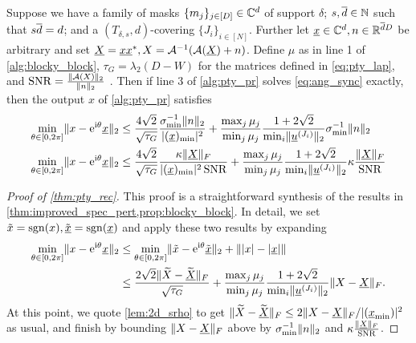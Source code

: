 \begin{theorem} \label{thm:pty_rec}
  Suppose we have a family of masks $\{m_j\}_{j \in [D]} \in \mathbb{C}^d$ of support $\delta$; $s, \overline{d} \in \mathbb{N}$ such that $s \overline{d} = d$; and a $(T_{\delta, s}, d)$-covering $\{J_i\}_{i \in [N]}$.  Further let $\underline{x} \in \mathbb{C}^d, n \in \mathbb{R}^{\overline{d} D}$ be arbitrary and set $\underline{X} = \underline{x} \underline{x}^*, X = \mathcal{A}^{-1}(\mathcal{A}(\underline{X}) + n)$.  Define $\mu$ as in line 1 of \cref{alg:blocky_block}, $\tau_G = \lambda_2(D - W)$ for the matrices defined in \eqref{eq:pty_lap}, and $\operatorname{SNR} = \frac{\lVert\mathcal{A}(X)\rVert_2}{\lVert n\rVert_2}$%
  .  Then if line 3 of \cref{alg:pty_pr} solves \eqref{eq:ang_sync} exactly, then the output $x$ of \cref{alg:pty_pr} satisfies \begin{equation}\begin{aligned} \min_{\theta \in [0, 2\pi]} \lVert x - \mathrm{e}^{\mathrm{i} \theta} \underline{x}\rVert_2 &\le \dfrac{4 \sqrt{2}}{\sqrt{\tau_G}} \dfrac{\sigma_{\min}^{-1} \lVert n\rVert_2}{\lvert(\underline{x})_{\min}\rvert^2} + \dfrac{\max_j \mu_j}{\min_j \mu_j} \dfrac{1 + 2 \sqrt{2}}{\min_i \lVert\underline{u}^{(J_i)}\rVert_2} \sigma_{\min}^{-1} \lVert n\rVert_2 \\ \min_{\theta \in [0, 2\pi]} \lVert x - \mathrm{e}^{\mathrm{i} \theta} \underline{x}\rVert_2 &\le \dfrac{4 \sqrt{2}}{\sqrt{\tau_G}} \dfrac{\kappa \lVert\underline{X}\rVert_F}{\lvert(\underline{x})_{\min}\rvert^2 \operatorname{SNR}} + \dfrac{\max_j \mu_j}{\min_j \mu_j} \dfrac{1 + 2 \sqrt{2}}{\min_i \lVert\underline{u}^{(J_i)}\rVert_2} \kappa \frac{\lVert\underline{X}\rVert_F}{\operatorname{SNR}} \end{aligned} \label{eq:pty_rec}\end{equation}
\end{theorem}

\begin{proof}[Proof of \cref{thm:pty_rec}]
  This proof is a straightforward synthesis of the results in \cref{thm:improved_spec_pert,prop:blocky_block}.  In detail, we set $\tilde{x} = \operatorname{sgn}(x), \tilde{\underline{x}} = \operatorname{sgn}(\underline{x})$ and apply these two results by expanding
  \begin{align*}
    \min_{\theta \in [0, 2\pi]} \lVert x - \mathrm{e}^{\mathrm{i} \theta} \underline{x}\rVert_2 &\le \min_{\theta \in [0, 2\pi]} \lVert\tilde{x} - \mathrm{e}^{\mathrm{i} \theta} \tilde{\underline{x}}\rVert_2 + \lVert\lvert x\rvert - \lvert\underline{x}\rvert\rVert \\
    &\le \dfrac{2 \sqrt{2} \lVert\widetilde{X} - \widetilde{\underline{X}}\rVert_F}{\sqrt{\tau_G}} + \dfrac{\max_j \mu_j}{\min_j \mu_j} \dfrac{1 + 2 \sqrt{2}}{\min_i \lVert\underline{u}^{(J_i)}\rVert_2} \lVert X - \underline{X}\rVert_F.
  \end{align*}
  At this point, we quote \cref{lem:2d_srho} to get $\lVert\widetilde{X} - \widetilde{\underline{X}}\rVert_F \le 2 \lVert X - \underline{X}\rVert_F / \lvert(\underline{x}_{\min})\rvert^2$ as usual, and finish by bounding $\lVert X - \underline{X}\rVert_F$ above by $\sigma_{\min}^{-1} \lVert n\rVert_2$ and $\kappa \frac{\lVert\underline{X}\rVert_F}{\operatorname{SNR}}$.  
\end{proof}

